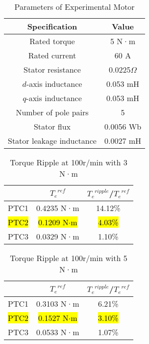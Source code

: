 \documentclass[sn-basic]{sn-jnl}
\theoremstyle{thmstyleone}%
\theoremstyle{thmstyletwo}%
\theoremstyle{thmstylethree}%
\theoremstyle{thmstyleone}%
\begin{document}
\begin{table}[h]
    \centering
  \caption{Parameters of Experimental Motor}
    \begin{tabular}{cc}
    \midrule
  
    Specification & Value \\
    \midrule
    Rated torque & 5 N·m \\
    Rated current & 60 A \\
    Stator resistance & 0.0225$\Omega$ \\
    $d$-axis inductance & 0.053 mH \\
    $q$-axis inductance & 0.053 mH \\
    Number of pole pairs & \multicolumn{1}{c}{5} \\
    Stator flux & 0.0056 Wb \\
    Stator leakage inductance & 0.0027 mH \\
   \midrule
 
    \end{tabular}%
  \label{tab:addlabel}%
\end{table}%



\begin{table}[h]
    \centering
  \caption{Torque Ripple at 100r/min with 3 N·m}
    \begin{tabular}{ccc}
    \midrule
    \multicolumn{1}{c}{} & ${{T_e}^{ref}}$ & \multicolumn{1}{p{6em}}{${{T_e}^{ripple}}$/${{T_e}^{ref}}$} \\
    \midrule
    PTC1 & 0.4235 N·m & 14.12\% \\
   \hl{ PTC2} & \hl{0.1209 N$\cdot$m }& \hl{4.03\% }\\
    PTC3 & 0.0329 N·m & 1.10\% \\
     \midrule
    \end{tabular}%
  \label{tab:addlabel}%
\end{table}%

\begin{table}[h]
  \centering
  \caption{Torque Ripple at 100r/min with 5 N·m}
     \begin{tabular}{ccc}
    \midrule
    \multicolumn{1}{c}{} & ${{T_e}^{ref}}$ & \multicolumn{1}{p{6em}}{${{T_e}^{ripple}}$/${{T_e}^{ref}}$} \\
    \midrule
    PTC1 & 0.3103 N·m & 6.21\% \\
    \hl{PTC2} & \hl{0.1527 N$\cdot$m }& \hl{3.10\%} \\
    PTC3 & 0.0533 N·m & 1.07\% \\
     \midrule
    \end{tabular}%
  \label{tab:addlabel1}%
\end{table}%
\end{document}
